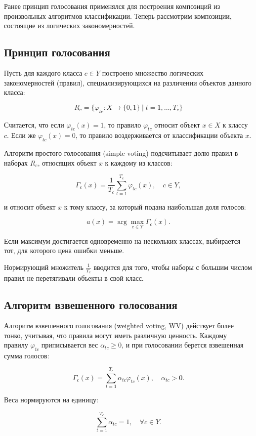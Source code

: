 Ранее принцип голосования применялся для построения композиций из произвольных алгоритмов классификации. Теперь рассмотрим композиции, состоящие из логических закономерностей.

\subsection{Принцип голосования}

Пусть для каждого класса $c \in Y$ построено множество логических закономерностей (правил), специализирующихся на различении объектов данного класса:

\[
    R_c = \{ \varphi_{tc} : X \to \{0, 1\} \mid t = 1, \dots, T_c \}
\]

Считается, что если $\varphi_{tc}(x) = 1$, то правило $\varphi_{tc}$ относит объект $x \in X$ к классу $c$. Если же $\varphi_{tc}(x) = 0$, то правило воздерживается от классификации объекта $x$.

Алгоритм простого голосования (simple voting) подсчитывает долю правил в наборах $R_c$, относящих объект $x$ к каждому из классов:

\[
    \Gamma_c(x) = \frac{1}{T_c} \sum_{t=1}^{T_c} \varphi_{tc}(x), \quad c \in Y,
\]

и относит объект $x$ к тому классу, за который подана наибольшая доля голосов:

\[
    a(x) = \arg \max_{c \in Y} \Gamma_c(x).
\]

Если максимум достигается одновременно на нескольких классах, выбирается тот, для которого цена ошибки меньше.

Нормирующий множитель $\frac{1}{T_c}$ вводится для того, чтобы наборы с большим числом правил не перетягивали объекты в свой класс.

\subsection{Алгоритм взвешенного голосования}
Алгоритм взвешенного голосования (weighted voting, WV) действует более тонко, учитывая, что правила могут иметь различную ценность. Каждому правилу $\varphi_{tc}$ приписывается вес $\alpha_{tc} \geq 0$, и при голосовании берется взвешенная сумма голосов:

\[
    \Gamma_c(x) = \sum_{t=1}^{T_c} \alpha_{tc} \varphi_{tc}(x), \quad \alpha_{tc} > 0.
\]

Веса нормируются на единицу:

\[
    \sum_{t=1}^{T_c} \alpha_{tc} = 1, \quad \forall c \in Y.
\]

